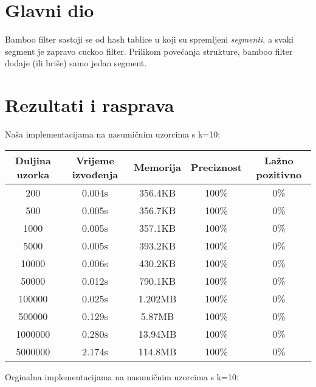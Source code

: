 \documentclass[seminarskirad]{fer}
\begin{document}
\chapter{Glavni dio}
\label{pog:glavni_dio}

Bamboo filter sastoji se od hash tablice u koji su spremljeni \textit{segmenti}, a svaki segment je zapravo cuckoo filter. Prilikom povećanja strukture, bamboo filter dodaje (ili briše) samo jedan segment.


\chapter{Rezultati i rasprava}
\label{pog:rezultati_i_rasprava}

Naša implementacijama na nasumičnim uzorcima s k=10:

\begin{center}
\begin{tabular}{||c c c c c||} 
 \hline
 Duljina uzorka & Vrijeme izvođenja & Memorija & Preciznost & Lažno pozitivno \\ [0.5ex] 
 \hline\hline
 200 & 0.004s & 356.4KB & 100\% & 0\% \\ 
 \hline
 500 & 0.005s & 356.7KB & 100\% & 0\% \\
 \hline
 1000 & 0.005s & 357.1KB & 100\% & 0\% \\
 \hline
 5000 & 0.005s & 393.2KB & 100\% & 0\% \\
 \hline
 10000 & 0.006s & 430.2KB & 100\% & 0\% \\
 \hline
 50000 & 0.012s & 790.1KB & 100\% & 0\% \\ 
 \hline
 100000 & 0.025s & 1.202MB & 100\% & 0\% \\
 \hline
 500000 & 0.129s & 5.87MB & 100\% & 0\% \\
 \hline
 1000000 & 0.280s & 13.94MB & 100\% & 0\% \\
 \hline
 5000000 & 2.174s & 114.8MB & 100\% & 0\% \\ [1ex] 
 \hline
\end{tabular}
\end{center}

Orginalna implementacijama na nasumičnim uzorcima s k=10:
\end{document}
